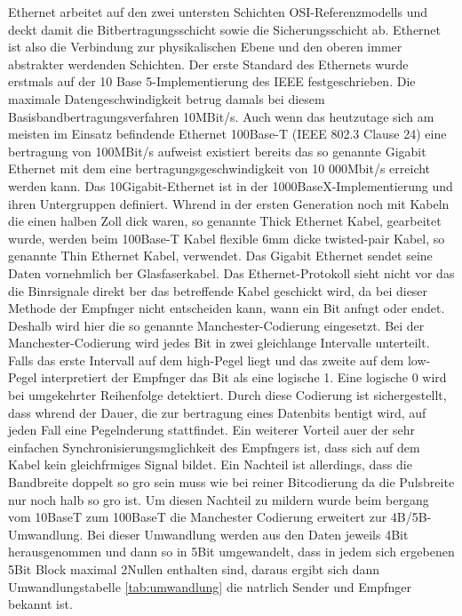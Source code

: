 \documentclass[a4paper]{book}%
\begin{document}
Ethernet arbeitet auf den zwei untersten Schichten OSI-Referenzmodells und deckt damit die Bitbertragungsschicht sowie die Sicherungsschicht ab. Ethernet ist also die Verbindung zur physikalischen Ebene und den oberen immer abstrakter werdenden Schichten.
Der erste Standard des Ethernets wurde erstmals auf der 10 Base 5-Implementierung des IEEE festgeschrieben. Die maximale Datengeschwindigkeit betrug damals bei diesem Basisbandbertragungsverfahren 10MBit/s. Auch wenn das heutzutage sich am meisten im Einsatz befindende Ethernet 100Base-T (IEEE 802.3 Clause 24) eine bertragung von 100MBit/s aufweist existiert bereits das so genannte Gigabit Ethernet mit dem eine bertragungsgeschwindigkeit von 10 000Mbit/s erreicht werden kann. Das 10Gigabit-Ethernet ist in der 1000BaseX-Implementierung und ihren Untergruppen definiert.
Whrend in der ersten Generation noch mit Kabeln die einen halben Zoll dick waren, so genannte Thick Ethernet  Kabel, gearbeitet wurde, werden beim 100Base-T Kabel flexible 6mm dicke twisted-pair Kabel, so genannte Thin Ethernet Kabel, verwendet. Das Gigabit Ethernet sendet seine Daten vornehmlich ber Glasfaserkabel. 
Das Ethernet-Protokoll sieht nicht vor das die Binrsignale direkt ber das betreffende Kabel geschickt wird, da bei dieser Methode der Empfnger nicht entscheiden kann, wann ein Bit anfngt oder endet. Deshalb wird hier die so genannte Manchester-Codierung eingesetzt. Bei der Manchester-Codierung wird jedes Bit in zwei gleichlange Intervalle unterteilt. Falls das erste Intervall auf dem high-Pegel liegt und das zweite auf dem low-Pegel interpretiert der Empfnger das Bit als eine logische 1. Eine logische 0 wird bei umgekehrter Reihenfolge detektiert. Durch diese Codierung ist sichergestellt, dass whrend der Dauer, die zur bertragung eines Datenbits bentigt wird, auf jeden Fall eine Pegelnderung stattfindet. Ein weiterer Vorteil auer der sehr einfachen Synchronisierungsmglichkeit des Empfngers ist, dass sich auf dem Kabel kein gleichfrmiges Signal bildet. Ein Nachteil ist allerdings, dass die Bandbreite doppelt so gro sein muss wie bei reiner Bitcodierung da die Pulsbreite nur noch halb so gro ist.
Um diesen Nachteil zu mildern wurde beim bergang vom 10BaseT zum 100BaseT die Manchester Codierung erweitert zur 4B/5B-Umwandlung. Bei dieser Umwandlung werden aus den Daten jeweils 4Bit herausgenommen und dann so in 5Bit umgewandelt, dass in jedem sich ergebenen 5Bit Block maximal 2Nullen enthalten sind, daraus ergibt sich dann Umwandlungstabelle \ref{tab:umwandlung} die natrlich Sender und Empfnger bekannt ist.
 
\end{document}
